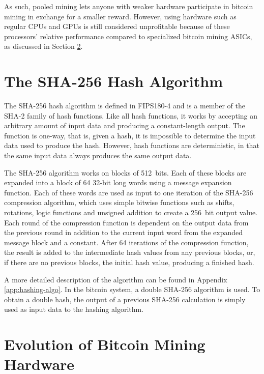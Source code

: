 As such, pooled mining lets anyone with weaker hardware participate in bitcoin mining in exchange for
a smaller reward. However, using hardware such as regular CPUs and GPUs is still considered unprofitable
because of these processors' relative performance compared to specialized bitcoin mining ASICs, as
discussed in Section \ref{sec:bitcoin-history}.

\section{The SHA-256 Hash Algorithm}

The SHA-256 hash algorithm is defined in FIPS180-4 \cite{fips180-4} and is a member of the SHA-2
family of hash functions. Like all hash functions, it works by accepting an arbitrary
amount of input data and producing a constant-length output. The function is one-way,
that is, given a hash, it is impossible to determine the input data used to produce
the hash. However, hash functions are deterministic, in that the same input data always
produces the same output data.

The SHA-256 algorithm works on blocks of 512~bits. Each of these blocks are expanded into a
block of 64 32-bit long words using a message expansion function. Each of these words are
used as input to one iteration of the SHA-256 compression algorithm, which uses simple bitwise functions
such as shifts, rotations, logic functions and unsigned addition to create a 256~bit
output value. Each round of the compression function is dependent on the output data from
the previous round in addition to the current input word from the expanded message block
and a constant.
After 64 iterations of the compression function, the result is added to the intermediate
hash values from any previous blocks, or, if there are no previous blocks, the initial
hash value, producing a finished hash.

A more detailed description of the algorithm can be found in Appendix \ref{app:hashing-algo}.
In the bitcoin system, a double SHA-256 algorithm is used. To obtain a double hash, the
output of a previous SHA-256 calculation is simply used as input data to the hashing
algorithm. \cite{fips180-4}


\section{Evolution of Bitcoin Mining Hardware}
\label{sec:bitcoin-history}

